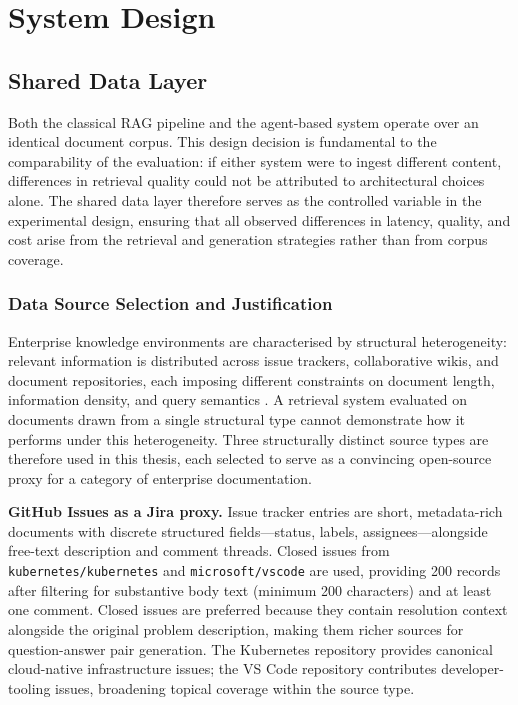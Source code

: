 
\chapter{System Design}
\label{ch:design}

\section{Shared Data Layer}

Both the classical RAG pipeline and the agent-based system operate over an identical document corpus. This design decision is fundamental to the comparability of the evaluation: if either system were to ingest different content, differences in retrieval quality could not be attributed to architectural choices alone. The shared data layer therefore serves as the controlled variable in the experimental design, ensuring that all observed differences in latency, quality, and cost arise from the retrieval and generation strategies rather than from corpus coverage.

\subsection{Data Source Selection and Justification}

Enterprise knowledge environments are characterised by structural heterogeneity: relevant information is distributed across issue trackers, collaborative wikis, and document repositories, each imposing different constraints on document length, information density, and query semantics \cite{gao2023ragsurvey}. A retrieval system evaluated on documents drawn from a single structural type cannot demonstrate how it performs under this heterogeneity. Three structurally distinct source types are therefore used in this thesis, each selected to serve as a convincing open-source proxy for a category of enterprise documentation.

\textbf{GitHub Issues as a Jira proxy.} Issue tracker entries are short, metadata-rich documents with discrete structured fields—status, labels, assignees—alongside free-text description and comment threads. Closed issues from \texttt{kubernetes/kubernetes} and \texttt{microsoft/vscode} are used, providing 200 records after filtering for substantive body text (minimum 200 characters) and at least one comment. Closed issues are preferred because they contain resolution context alongside the original problem description, making them richer sources for question-answer pair generation. The Kubernetes repository provides canonical cloud-native infrastructure issues; the VS Code repository contributes developer-tooling issues, broadening topical coverage within the source type.

